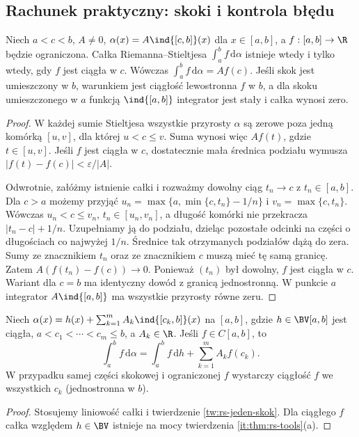 \subsection*{Rachunek praktyczny: skoki i kontrola błędu}
\begin{twierdzenie}\label{tw:rs-jeden-skok}
Niech $a<c<b$, $A\ne0$, $\alpha(x)=A\ind{[c,b]}(x)$ dla $x\in[a,b]$, a $f:[a,b]\to\R$ będzie ograniczona. Całka Riemanna--Stieltjesa $\int_a^b f\,\mathrm d\alpha$ istnieje wtedy i tylko wtedy, gdy $f$ jest ciągła w $c$. Wówczas $\int_a^b f\,\mathrm d\alpha=Af(c)$. Jeśli skok jest umieszczony w $b$, warunkiem jest ciągłość lewostronna $f$ w $b$, a dla skoku umieszczonego w $a$ funkcją $\ind{[a,b]}$ integrator jest stały i całka wynosi zero.
\end{twierdzenie}
\begin{proof}
W każdej sumie Stieltjesa wszystkie przyrosty $\alpha$ są zerowe poza jedną komórką $[u,v]$, dla której $u<c\le v$. Suma wynosi więc $Af(t)$, gdzie $t\in[u,v]$. Jeśli $f$ jest ciągła w $c$, dostatecznie mała średnica podziału wymusza $|f(t)-f(c)|<\varepsilon/|A|$.

Odwrotnie, załóżmy istnienie całki i rozważmy dowolny ciąg $t_n\to c$ z $t_n\in[a,b]$. Dla $c>a$ możemy przyjąć $u_n=\max\{a,\min\{c,t_n\}-1/n\}$ i $v_n=\max\{c,t_n\}$. Wówczas $u_n<c\le v_n$, $t_n\in[u_n,v_n]$, a długość komórki nie przekracza $|t_n-c|+1/n$. Uzupełniamy ją do podziału, dzieląc pozostałe odcinki na części o długościach co najwyżej $1/n$. Średnice tak otrzymanych podziałów dążą do zera. Sumy ze znacznikiem $t_n$ oraz ze znacznikiem $c$ muszą mieć tę samą granicę. Zatem $A(f(t_n)-f(c))\to0$. Ponieważ $(t_n)$ był dowolny, $f$ jest ciągła w $c$. Wariant dla $c=b$ ma identyczny dowód z granicą jednostronną. W punkcie $a$ integrator $A\ind{[a,b]}$ ma wszystkie przyrosty równe zeru.
\end{proof}
\begin{wniosek}\label{wn:rs-suma-skokow}
Niech $\alpha(x)=h(x)+\sum_{k=1}^m A_k\ind{[c_k,b]}(x)$ na $[a,b]$, gdzie $h\in\BV[a,b]$ jest ciągła, $a<c_1<\cdots<c_m\le b$, a $A_k\in\R$. Jeśli $f\in C[a,b]$, to
\[
\int_a^b f\,\mathrm d\alpha=\int_a^b f\,\mathrm dh+\sum_{k=1}^m A_kf(c_k).
\]
W przypadku samej części skokowej i ograniczonej $f$ wystarczy ciągłość $f$ we wszystkich $c_k$ (jednostronna w $b$).
\end{wniosek}
\begin{proof}
Stosujemy liniowość całki i twierdzenie \ref{tw:rs-jeden-skok}. Dla ciągłego $f$ całka względem $h\in\BV$ istnieje na mocy twierdzenia \ref{it:thm:rs-tools}(a).
\end{proof}
